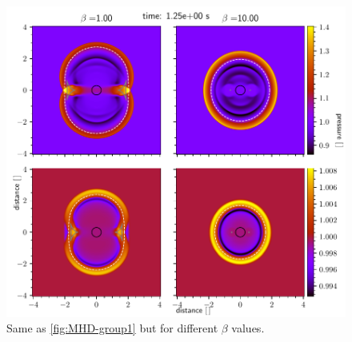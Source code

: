 \begin{figure}[H]
	\centering
	\includegraphics[width=\linewidth]{images/group-speed-pressure2.pdf}
	\caption{Same as \cref{fig:MHD-group1} but for different $\beta$ values.}
	\label{fig:MHD-group2}
\end{figure}



